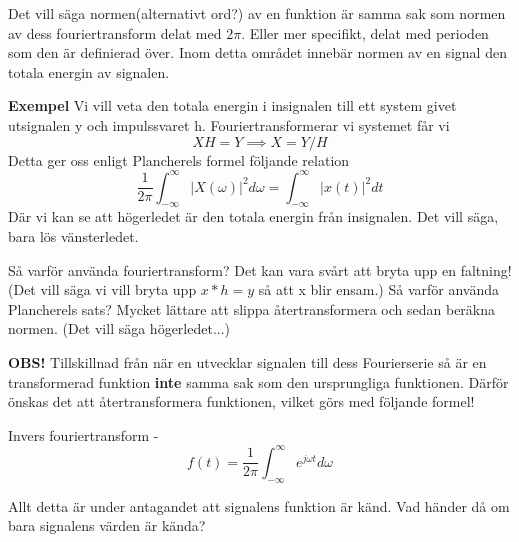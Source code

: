\documentclass{article}
\begin{document}
Det vill säga normen(alternativt ord?) av en funktion är samma sak som normen av dess fouriertransform delat med $2 \pi$. Eller mer specifikt, delat med perioden som den är definierad över. Inom detta området innebär normen av en signal den totala energin av signalen. %

\textbf{Exempel}
Vi vill veta den totala energin i insignalen till ett system givet utsignalen y och impulssvaret h. Fouriertransformerar vi systemet får vi 
\[XH = Y \implies X = Y/H\]
Detta ger oss enligt Plancherels formel följande relation
\[ \frac{1}{2 \pi} \int_{-\infty}^{\infty} |X(\omega)|^2 d \omega = \int_{-\infty}^{\infty} |x(t)|^2 d t \]
Där vi kan se att högerledet är den totala energin från insignalen. 
Det vill säga, bara lös vänsterledet. 

Så varför använda fouriertransform? Det kan vara svårt att bryta upp en faltning! (Det vill säga vi vill bryta upp $x*h=y$ så att x blir ensam.)
Så varför använda Plancherels sats? Mycket lättare att slippa återtransformera och sedan beräkna normen. (Det vill säga högerledet...)

\textbf{OBS!} Tillskillnad från när en utvecklar signalen till dess Fourierserie så är en transformerad funktion \textbf{inte} samma sak som den ursprungliga funktionen. Därför önskas det att återtransformera funktionen, vilket görs med följande formel!

Invers fouriertransform - 
\[f(t) = \frac{1}{2 \pi} \int_{-\infty}^{\infty}  e^{j \omega t} d\omega \]

Allt detta är under antagandet att signalens funktion är känd. Vad händer då om bara signalens värden är kända?

\end{document}
